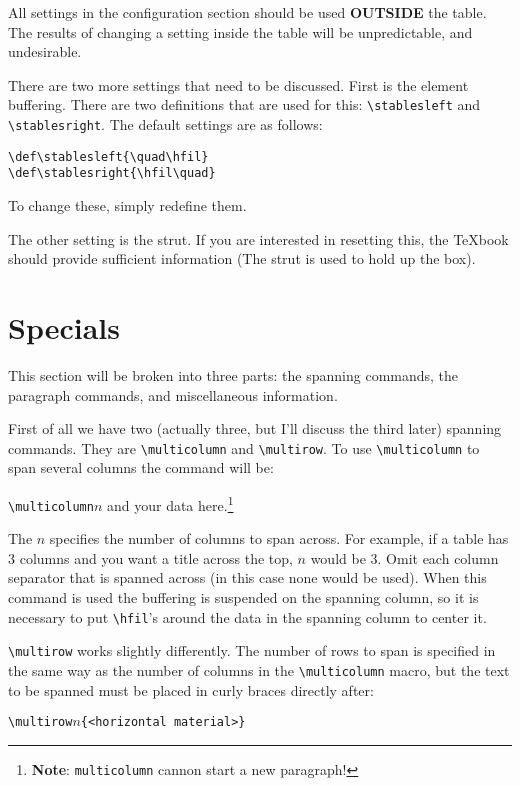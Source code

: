 \documentclass{article}
\begin{document}
\bigskip

All settings in the configuration section should be used {\bf OUTSIDE}
the table.  The results of changing a setting inside the table will be
unpredictable, and undesirable.

There are two more settings that need to be discussed.  First is the
element buffering.  There are two definitions that are used for this:
\verb|\stablesleft| and \verb|\stablesright|.  The default settings are as
follows:

\begin{verbatim}
\def\stablesleft{\quad\hfil}
\def\stablesright{\hfil\quad}
\end{verbatim}

To change these, simply redefine them.

The other setting is the strut.  If you are interested in resetting
this, the \TeX book should provide sufficient information (The strut
is used to hold up the box).

\section{Specials}

This section will be broken into three parts:  the spanning commands, the 
paragraph commands, and miscellaneous information.

First of all we have two (actually three, but I'll discuss the third later) 
spanning commands.  They are \verb|\multicolumn| and \verb|\multirow|.  To use 
\verb|\multicolumn| to span several columns the command will be:

\verb|\multicolumn|$n$ and your data here.\footnote{\textbf{Note}: \texttt{multicolumn} cannon start a new paragraph!}

The $n$ specifies the number of columns to span across.  For 
example, if a table has 3 columns and you want a title across the top, 
$n$ would be 3.  Omit each column separator that is spanned across (in 
this case none would be used).  When this command is used the buffering is 
suspended on the spanning column, so it is necessary to put \verb|\hfil|'s around 
the data in the spanning column to center it.

\verb|\multirow| works slightly differently.  The number of rows to span is 
specified in the same way as the number of columns in the \verb|\multicolumn| macro, 
but the text to be spanned must be placed in curly braces directly after:

\verb|\multirow|$n$\verb|{<horizontal material>}|
\end{document}
